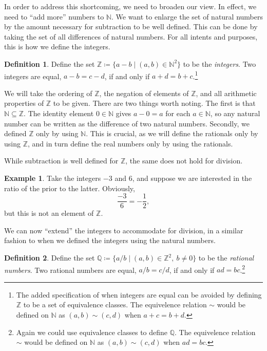 \documentclass{article}
\newcommand{\N}{\mathbb{N}}
\newcommand{\Q}{\mathbb{Q}}
\newcommand{\Z}{\mathbb{Z}}
\theoremstyle{definition}
\newtheorem{definition}{Definition}[section]
\newtheorem{example}{Example}[section]
\begin{document}
	In order to address this shortcoming, we need to broaden our view. In effect, we need to ``add more'' numbers to $ \N $. We want to enlarge the set of natural numbers by the amount necessary for subtraction to be well defined. This can be done by taking the set of all differences of natural numbers. For all intents and purposes, this is how we define the integers. 
	\begin{definition}
		Define the set $ \Z\coloneqq\{a-b\mid(a,b)\in\N^2\} $ to be the \textit{\color{red}integers}. Two integers are equal, $ a-b=c-d $, if and only if $ a+d=b+c $.\footnote{The added specification of when integers are equal can be avoided by defining $ \Z $ to be a set of equivalence classes. The equivelence relation $ \sim $ would be defined on $ \N $ as $ (a,b)\sim(c,d) $ when $ a+c=b+d $.}  
	\end{definition}
	\noindent We will take the ordering of $ \Z $, the negation of elements of $ \Z $, and all arithmetic properties of $ \Z $ to be given. There are two things worth noting. The first is that $ \N\subseteq\Z $. The identity element $ 0\in\N $ gives $ a-0=a $ for each $ a\in\N $, so any natural number can be written as the difference of two natural numbers. Secondly, we defined $ \Z $ only by using $ \N $. This is crucial, as we will define the rationals only by using $ \Z $, and in turn define the real numbers only by using the rationals.
	
	While subtraction is well defined for $ \Z $, the same does not hold for division. 
	\begin{example}
		Take the integers $ -3 $ and 6, and suppose we are interested in the ratio of the prior to the latter. Obviously, $$ \frac{-3}{6}=-\frac{1}{2} ,$$ but this is not an element of $ \Z $. 
	\end{example}
	We can now ``extend'' the integers to accommodate for division, in a similar fashion to when we defined the integers using the natural numbers. 
	\begin{definition}
		Define the set $ \Q\coloneqq\{a/b\mid(a,b)\in\Z^2,\ b\neq0\} $ to be the \textit{\color{red}rational numbers}. Two rational numbers are equal, $ a/b=c/d $, if and only if $ ad=bc $.\footnote{Again we could use equivalence classes to define $ \Q $. The equivelence relation $ \sim $ would be defined on $ \N $ as $ (a,b)\sim(c,d) $ when $ ad=bc $.}  
	\end{definition}
\end{document}
